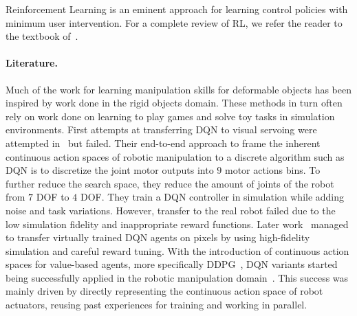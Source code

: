 \documentclass[\home/main.tex]{subfiles}
\begin{document}
Reinforcement Learning is an eminent approach for learning control policies with minimum user intervention. For a complete review of RL, we refer the reader to the textbook of~\textcite{Sutton2018}.


\paragraph{Literature.}
Much of the work for learning manipulation skills for deformable objects has been inspired by work done in the rigid objects domain. These methods in turn often rely on work done on learning to play games and solve toy tasks in simulation environments. First attempts at transferring DQN to visual servoing were attempted in~\autocite{Zhang2015} but failed. Their end-to-end approach to frame the inherent continuous action spaces of robotic manipulation to a discrete algorithm such as DQN is to discretize the joint motor outputs into $9$ motor actions bins. To further reduce the search space, they reduce the amount of joints of the robot from $7$ DOF to $4$ DOF. They train a DQN controller in simulation while adding noise and task variations. However, transfer to the real robot failed due to the low simulation fidelity and inappropriate reward functions. Later work~\autocite{James2016} managed to transfer virtually trained DQN agents on pixels by using high-fidelity simulation and careful reward tuning. With the introduction of continuous action spaces for value-based agents, more specifically DDPG~\autocite{Lillicrap2015}, DQN variants started being successfully applied in the robotic manipulation domain~\autocite{Gu2017}. This success was mainly driven by directly representing the continuous action space of robot actuators, reusing past experiences for training and working in parallel.
\end{document}
